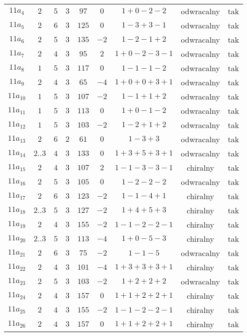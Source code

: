 \begin{longtable}{ccccccccc}
$11a_{4}$ & $2$ & $5$ & $3$ & $97$ & $0$ & $1+0-2-2$ & odwracalny & tak \\
$11a_{5}$ & $2$ & $6$ & $3$ & $125$ & $0$ & $1-3+3-1$ & odwracalny & tak \\
$11a_{6}$ & $2$ & $5$ & $3$ & $135$ & $-2$ & $1-2-1+2$ & odwracalny & tak \\
$11a_{7}$ & $2$ & $4$ & $3$ & $95$ & $2$ & $1+0-2-3-1$ & odwracalny & tak \\
$11a_{8}$ & $1$ & $5$ & $3$ & $117$ & $0$ & $1-1-1-2$ & odwracalny & tak \\
$11a_{9}$ & $2$ & $4$ & $3$ & $65$ & $-4$ & $1+0+0+3+1$ & odwracalny & tak \\
$11a_{10}$ & $1$ & $5$ & $3$ & $107$ & $-2$ & $1-1+1+2$ & odwracalny & tak \\
$11a_{11}$ & $1$ & $5$ & $3$ & $113$ & $0$ & $1+0-1-2$ & odwracalny & tak \\
$11a_{12}$ & $1$ & $5$ & $3$ & $103$ & $-2$ & $1-2+1+2$ & odwracalny & tak \\
$11a_{13}$ & $2$ & $6$ & $2$ & $61$ & $0$ & $1-3+3$ & odwracalny & tak \\
$11a_{14}$ & $2..3$ & $4$ & $3$ & $133$ & $0$ & $1+3+5+3+1$ & odwracalny & tak \\
$11a_{15}$ & $2$ & $4$ & $3$ & $107$ & $2$ & $1-1-3-3-1$ & chiralny & tak \\
$11a_{16}$ & $2$ & $5$ & $3$ & $105$ & $0$ & $1-2-2-2$ & odwracalny & tak \\
$11a_{17}$ & $2$ & $6$ & $3$ & $123$ & $-2$ & $1-1-4+1$ & chiralny & tak \\
$11a_{18}$ & $2..3$ & $5$ & $3$ & $127$ & $-2$ & $1+4+5+3$ & chiralny & tak \\
$11a_{19}$ & $2$ & $4$ & $3$ & $155$ & $-2$ & $1-1-2-2-1$ & chiralny & tak \\
$11a_{20}$ & $2..3$ & $5$ & $3$ & $113$ & $-4$ & $1+0-5-3$ & chiralny & tak \\
$11a_{21}$ & $2$ & $6$ & $3$ & $75$ & $-2$ & $1-1-5$ & odwracalny & tak \\
$11a_{22}$ & $2$ & $4$ & $3$ & $101$ & $-4$ & $1+3+3+3+1$ & chiralny & tak \\
$11a_{23}$ & $2$ & $5$ & $3$ & $103$ & $-2$ & $1+2+2+2$ & odwracalny & tak \\
$11a_{24}$ & $2$ & $4$ & $3$ & $157$ & $0$ & $1+1+2+2+1$ & chiralny & tak \\
$11a_{25}$ & $2$ & $4$ & $3$ & $155$ & $-2$ & $1-1-2-2-1$ & chiralny & tak \\
$11a_{26}$ & $2$ & $4$ & $3$ & $157$ & $0$ & $1+1+2+2+1$ & chiralny & tak \\

\end{longtable}
